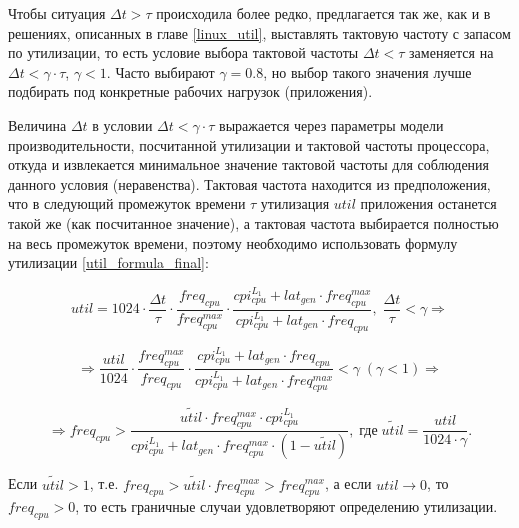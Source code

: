     Чтобы ситуация $\Delta t > \tau$ происходила более редко, предлагается так же, как и в решениях,
    описанных в главе \ref{linux_util}, выставлять тактовую частоту с запасом по утилизации, то есть
    условие выбора тактовой частоты $\Delta t < \tau$ заменяется на $\Delta t < \gamma \cdot \tau$,
    $\gamma < 1$. Часто выбирают $\gamma = 0.8$, но выбор такого значения лучше подбирать под
    конкретные рабочих нагрузок (приложения).

    Величина $\Delta t$ в условии $\Delta t < \gamma \cdot \tau$ выражается через параметры модели
    производительности, посчитанной утилизации и тактовой частоты процессора, откуда и извлекается минимальное
    значение тактовой частоты для соблюдения данного условия (неравенства). Тактовая частота находится из
    предположения, что в следующий промежуток времени $\tau$ утилизация $util$ приложения останется
    такой же (как посчитанное значение), а тактовая частота выбирается полностью на весь промежуток времени,
    поэтому необходимо использовать формулу утилизации \eqref{util_formula_final}:

    \begin{equation}
        util = 1024 \cdot \frac{\Delta t}{\tau} \cdot \frac{freq_{cpu}}{freq_{cpu}^{max}} \cdot
            \frac{cpi_{cpu}^{L_1} + lat_{gen} \cdot freq_{cpu}^{max}}
                 {cpi_{cpu}^{L_1} + lat_{gen} \cdot freq_{cpu}}, \; \frac{\Delta t}{\tau} < \gamma \Rightarrow
    \end{equation}

    \begin{equation}
        \Rightarrow \frac{util}{1024} \cdot \frac{freq_{cpu}^{max}}{freq_{cpu}} \cdot
        \frac{cpi_{cpu}^{L_1} + lat_{gen} \cdot freq_{cpu}}
             {cpi_{cpu}^{L_1} + lat_{gen} \cdot freq_{cpu}^{max}} < \gamma \; (\gamma < 1) \Rightarrow
    \end{equation}

    \begin{equation} \label{optimal_cpufreq}
        \Rightarrow freq_{cpu} > \frac{\tilde{util} \cdot freq_{cpu}^{max} \cdot cpi_{cpu}^{L_1}}
        {cpi_{cpu}^{L_1} + lat_{gen} \cdot freq_{cpu}^{max} \cdot (1 - \tilde{util})}, \;
        \text{где} \; \tilde{util} = \frac{util}{1024 \cdot \gamma}.
    \end{equation}

    Если $\tilde{util} > 1$, т.е. $freq_{cpu} > \tilde{util} \cdot freq_{cpu}^{max} > freq_{cpu}^{max}$,
    а если $util \rightarrow 0$, то $freq_{cpu} > 0$, то есть граничные случаи удовлетворяют определению
    утилизации.

